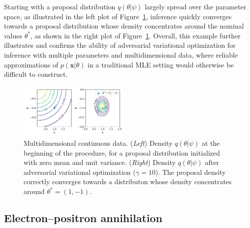 \documentclass[twocolumn,superscriptaddress,aps]{revtex4-1}
\theoremstyle{plain}
\begin{document}
Starting with a proposal distribution $q(\theta|\psi)$ largely spread over
the parameter space, as illustrated in the left plot of Figure~\ref{fig:multi},
inference quickly converges towards a proposal distribution whose density
concentrates around the nominal values $\theta^*$, as shown in the right plot of Figure~\ref{fig:multi}.
Overall, this example further illustrates and confirms the ability of adversarial
variational optimization for inference with multiple parameters and multidimensional
data, where reliable approximations of $p(\mathbf{x}|\theta)$ in a traditional
MLE setting would otherwise be difficult to construct.

\begin{figure}
    \centering
    \includegraphics[width=0.48\textwidth]{figures/multi.pdf}
    \caption{Multidimensional continuous data.
             ({\it Left}) Density $q(\theta|\psi)$ at the beginning of the procedure, for a proposal distribution initialized with zero mean and unit variance.
             ({\it Right}) Density $q(\theta|\psi)$ after adversarial variational optimization ($\gamma=10$). The proposal density correctly converges towards a distributon whose density concentrates around $\theta^* = (1, -1)$.
             }\label{fig:multi}
\end{figure}


\subsection{Electron--positron annihilation}
\end{document}
